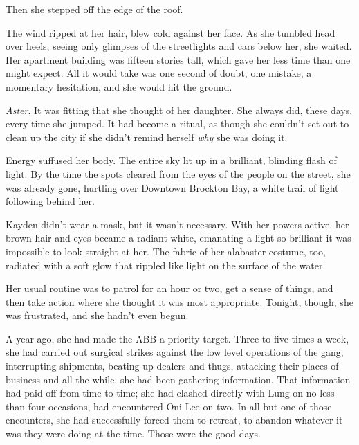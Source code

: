 Then she stepped off the edge of the roof.



The wind ripped at her hair, blew cold against her face.  As she tumbled head over heels, seeing only glimpses of the streetlights and cars below her, she waited.  Her apartment building was fifteen stories tall, which gave her less time than one might expect.  All it would take was one second of doubt, one mistake, a momentary hesitation, and she would hit the ground.



\emph{Aster}.  It was fitting that she thought of her daughter.  She always did, these days, every time she jumped.  It had become a ritual, as though she couldn't set out to clean up the city if she didn't remind herself \emph{why} she was doing it.



Energy suffused her body.  The entire sky lit up in a brilliant, blinding flash of light.  By the time the spots cleared from the eyes of the people on the street, she was already gone, hurtling over Downtown Brockton Bay, a white trail of light following behind her.



Kayden didn't wear a mask, but it wasn't necessary.  With her powers active, her brown hair and eyes became a radiant white, emanating a light so brilliant it was impossible to look straight at her.  The fabric of her alabaster costume, too, radiated with a soft glow that rippled like light on the surface of the water.



Her usual routine was to patrol for an hour or two, get a sense of things, and then take action where she thought it was most appropriate.  Tonight, though, she was frustrated, and she hadn't even begun.



A year ago, she had made the ABB a priority target.  Three to five times a week, she had carried out surgical strikes against the low level operations of the gang, interrupting shipments, beating up dealers and thugs, attacking their places of business and all the while, she had been gathering information.  That information had paid off from time to time; she had clashed directly with Lung on no less than four occasions, had encountered Oni Lee on two.  In all but one of those encounters, she had successfully forced them to retreat, to abandon whatever it was they were doing at the time.  Those were the good days.



